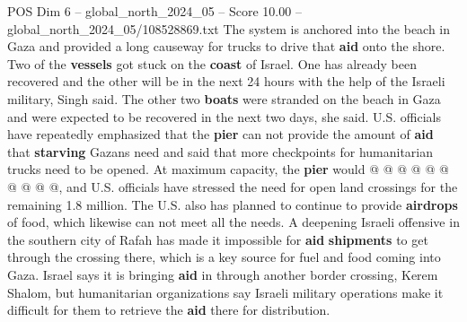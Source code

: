 \begin{textsample}{POS Dim 6 – global\_north\_2024\_05 – Score 10.00 – global\_north\_2024\_05/108528869.txt}
The system is anchored into the beach in Gaza and provided a long causeway for trucks to drive that \textbf{aid} onto the shore.
Two of the \textbf{vessels} got stuck on the \textbf{coast} of Israel.
One has already been recovered and the other will be in the next 24 hours with the help of the Israeli military, Singh said.
The other two \textbf{boats} were stranded on the beach in Gaza and were expected to be recovered in the next two days, she said.
U.S. officials have repeatedly emphasized that the \textbf{pier} can not provide the amount of \textbf{aid} that \textbf{starving} Gazans need and said that more checkpoints for humanitarian trucks need to be opened.
At maximum capacity, the \textbf{pier} would @ @ @ @ @ @ @ @ @ @, and U.S. officials have stressed the need for open land crossings for the remaining 1.8 million.
The U.S. also has planned to continue to provide \textbf{airdrops} of food, which likewise can not meet all the needs.
A deepening Israeli offensive in the southern city of Rafah has made it impossible for \textbf{aid} \textbf{shipments} to get through the crossing there, which is a key source for fuel and food coming into Gaza.
Israel says it is bringing \textbf{aid} in through another border crossing, Kerem Shalom, but humanitarian organizations say Israeli military operations make it difficult for them to retrieve the \textbf{aid} there for distribution.

\end{textsample}
